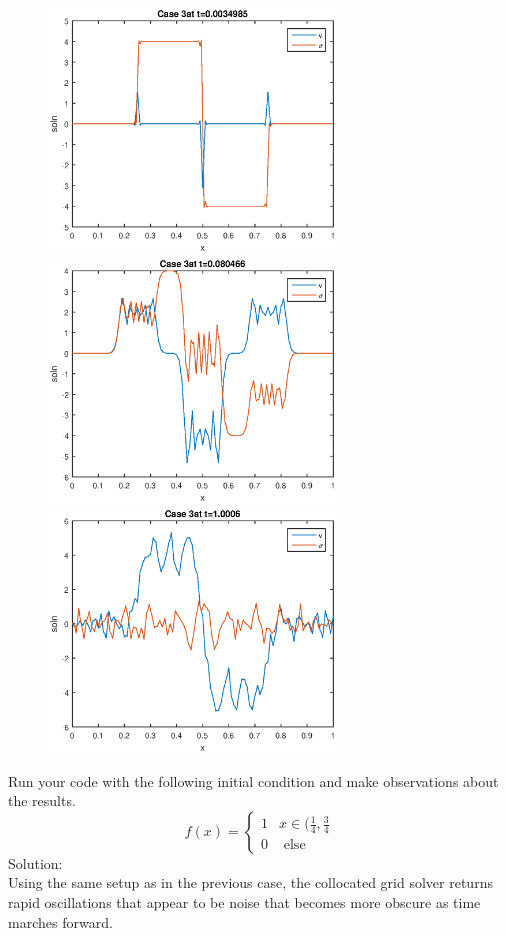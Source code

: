 \begin{figure}[h]
\centering
\includegraphics[width=3in]{initCol3}
\includegraphics[width=3in]{midCol3}\\
\includegraphics[width=3in]{endCol3}
\end{figure}
\item Run your code with the following initial condition and make observations about the results.
$$f(x)=\left\{\begin{array}{cc}1&x\in(\frac{1}{4},\frac{3}{4}\\ 0&\text{ else }\end{array}\right.$$
Solution:\\
Using the same setup as in the previous case, the collocated grid solver returns rapid oscillations that appear to be noise that becomes more obscure as time marches forward.
